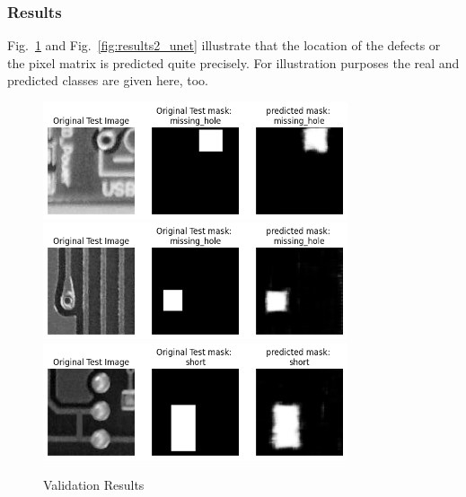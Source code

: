 \documentclass[12pt]{article}
\begin{document}
\clearpage
\newpage

\subsubsection{Results}
Fig.~\ref{fig:results1_unet} and Fig.~\ref{fig:results2_unet} illustrate that the location of the defects or the pixel matrix is predicted quite precisely. For illustration purposes the real and predicted classes are given here, too.
															  
\begin{figure}[h]
    \centering
    \includegraphics[width=0.8\textwidth]{./graphics/output1.png}
    \includegraphics[width=0.8\textwidth]{./graphics/output2.png}
    \includegraphics[width=0.8\textwidth]{./graphics/output3.png}

    \caption{Validation Results}
    \label{fig:results1_unet}
\end{figure}
\end{document}
